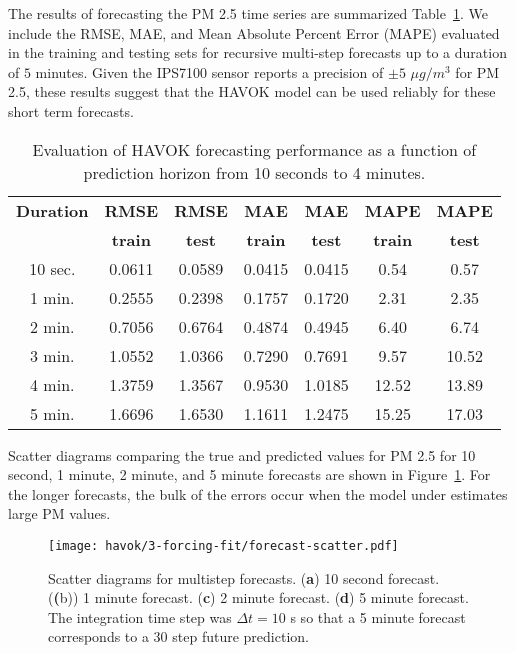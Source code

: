 The results of forecasting the PM 2.5 time series are summarized
Table~\ref{tab:havok-forecasting-results}. We include the RMSE, MAE, and Mean
Absolute Percent Error (MAPE) evaluated in the training and testing sets for
recursive multi-step forecasts up to a duration of $5$ minutes. Given the
IPS7100 sensor reports a precision of $\pm 5$ $\mu g/m^3$ for PM 2.5, these
results suggest that the HAVOK model can be used reliably for these short term forecasts.


\begin{table}[t]
  \caption{Evaluation of HAVOK forecasting performance as a function of
    prediction horizon from 10 seconds to 4 minutes. \vspace{0.15cm}}
  \label{tab:havok-forecasting-results}
  \centering
  \begin{tabular}{ccccccc} \hline
    \textbf{Duration} & \textbf{RMSE}  & \textbf{RMSE} & \textbf{MAE}   & \textbf{MAE}  & \textbf{MAPE}  & \textbf{MAPE} \\
                      & \textbf{train} & \textbf{test} & \textbf{train} & \textbf{test} & \textbf{train} & \textbf{test} \\\hline
    10 sec.	  & 0.0611 & 0.0589 & 0.0415 & 0.0415 & 0.54 & 0.57 \\
    1 min.	  & 0.2555 & 0.2398 & 0.1757 & 0.1720 & 2.31 & 2.35 \\
    2 min.	  & 0.7056 & 0.6764 & 0.4874 & 0.4945 & 6.40 & 6.74 \\
    3 min.	  & 1.0552 & 1.0366 & 0.7290 & 0.7691 & 9.57 & 10.52 \\
    4 min.	  & 1.3759 & 1.3567 & 0.9530 & 1.0185 & 12.52 & 13.89 \\
    5 min. 	  & 1.6696 & 1.6530 & 1.1611 & 1.2475 & 15.25 & 17.03
  \end{tabular}
\end{table}

Scatter diagrams comparing the true and predicted values for PM 2.5 for 10
second, 1 minute, 2 minute, and 5 minute forecasts are shown in
Figure~\ref{fig:forecasting-scatter}. For the longer forecasts, the bulk of the
errors occur when the model under estimates large PM values. 

\begin{figure}[h]
  \centering
  \texttt{[image: havok/3-forcing-fit/forecast-scatter.pdf]}
  \caption{Scatter diagrams for multistep forecasts. (\textbf{a}) 10 second
    forecast. (\textbf(b)) 1 minute forecast. (\textbf{c}) 2 minute forecast.
    (\textbf{d}) 5 minute forecast. The integration time step was $\Delta t =
    10$ s so that a 5 minute forecast corresponds to a 30 step future prediction.}
  \label{fig:forecasting-scatter}
\end{figure}

